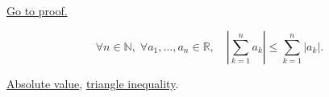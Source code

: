 \begin{remark*}[Proof]
\hyperref[prf:absolute-value-sum-bound]{Go to proof.}
\end{remark*}

\begin{remark*}
\[
  \forall n \in \mathbb{N},\;
  \forall a_1, \ldots, a_n \in \mathbb{R},\quad
  \left\lvert \sum_{k=1}^{n} a_k \right\rvert
  \le \sum_{k=1}^{n} \lvert a_k \rvert.
\]
\end{remark*}

\begin{dependencies}
\hyperref[def:absolute-value]{Absolute value},
\hyperref[thm:triangle-inequality]{triangle inequality}.
\end{dependencies}
